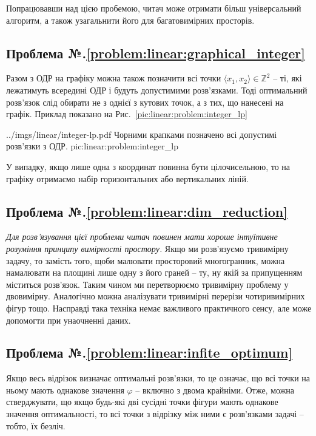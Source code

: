 \documentclass[\main/book.tex]{subfiles}
\begin{document}
Попрацювавши над цією пробемою, читач може отримати більш універсальний алгоритм, а також узагальнити його для багатовимірних просторів.

\subsection*{Проблема №.\ref{problem:linear:graphical_integer}}

Разом з ОДР на графіку можна також позначити всі точки $\langle x_1, x_2 \rangle \in \mathbb{Z}^2$ -- ті, які лежатимуть всередині ОДР і будуть допустимими розв'язками. Тоді оптимальний розв'язок слід обирати не з однієї з кутових точок, а з тих, що нанесені на графік. Приклад показано на Рис.~\ref{pic:linear:problem:integer_lp}

\illustration
 {../imgs/linear/integer-lp.pdf}
 {Чорними крапками позначено всі допустимі розв'язки з ОДР.}
 {pic:linear:problem:integer_lp}

У випадку, якщо лише одна з координат повинна бути цілочисельною, то на графіку отримаємо набір горизонтальних або вертикальних ліній.

\subsection*{Проблема №.\ref{problem:linear:dim_reduction}}

\textit{Для розв'язування цієї проблеми читач повинен мати хороше інтуїтивне розуміння принципу вимірності простору.} Якщо ми розв'язуємо тривимірну задачу, то замість того, щоби малювати просторовий многогранник, можна намалювати на площині лише одну з його граней -- ту, ну якій за припущенням міститься розв'язок. Таким чином ми перетворюємо тривимірну проблему у двовимірну. Аналогічно можна аналізувати тривимірні перерізи чотиривимірних фігур тощо. Насправді така техніка немає важливого практичного сенсу, але може допомогти при унаочненні даних.

\subsection*{Проблема №.\ref{problem:linear:infite_optimum}}

Якщо весь відрізок визначає оптимальні розв'язки, то це означає, що всі точки на ньому мають однакове значення $\varphi$ -- включно з двома крайніми. Отже, можна стверджувати, що якщо будь-які дві сусідні точки фігури мають однакове значення оптимальності, то всі точки з відрізку між ними є розв'язками задачі -- тобто, їх безліч.
\end{document}
